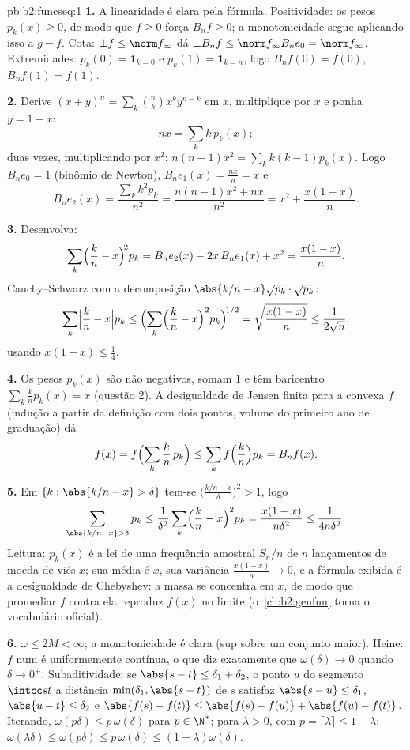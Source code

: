 \begin{solution}{pb:b2:funcseq:1}
\textbf{1.} A linearidade é clara pela fórmula. Positividade:
os pesos $p_k(x) \geq 0$, de modo que $f \geq 0$ força $B_nf \geq
0$; a monotonicidade segue aplicando isso a $g - f$. Cota: $\pm f \leq
\norm f_\infty$ dá $\pm B_nf \leq \norm f_\infty B_ne_0 =
\norm f_\infty$. Extremidades: $p_k(0) = \mathbf 1_{k=0}$ e
$p_k(1) = \mathbf 1_{k=n}$, logo $B_nf(0) = f(0)$, $B_nf(1) =
f(1)$.

\textbf{2.} Derive $(x+y)^n = \sum_k\binom nk x^ky^{n-k}$
em $x$, multiplique por $x$ e ponha $y = 1 - x$:
\[
nx = \sum_k k\,p_k(x) ;
\]
duas vezes, multiplicando por $x^2$: $n(n-1)x^2 = \sum_k k(k-1)p_k(x)$.
Logo $B_ne_0 = 1$ (binômio de Newton), $B_ne_1(x) =
\frac{nx}{n} = x$ e
\[
B_ne_2(x) = \frac{\sum_k k^2p_k}{n^2}
= \frac{n(n-1)x^2 + nx}{n^2}
= x^2 + \frac{x(1-x)}{n} .
\]

\textbf{3.} Desenvolva:
\[
\sum_k\Bigl(\frac kn - x\Bigr)^{\!2} p_k
= B_ne_2(x) - 2x\,B_ne_1(x) + x^2
= \frac{x(1-x)}{n} .
\]
Cauchy--Schwarz com a decomposição $\abs{k/n - x}\sqrt{p_k}
\cdot \sqrt{p_k}$:
\[
\sum_k\Bigl|\frac kn - x\Bigr| p_k
\leq \Bigl(\sum_k\Bigl(\frac kn - x\Bigr)^2
p_k\Bigr)^{\!1/2}
= \sqrt{\frac{x(1-x)}{n}} \leq \frac{1}{2\sqrt n},
\]
usando $x(1-x) \leq \frac14$.

\textbf{4.} Os pesos $p_k(x)$ são não negativos, somam $1$
e têm baricentro $\sum_k \frac kn p_k(x) = x$ (questão 2). A
desigualdade de Jensen finita para a convexa $f$ (indução a partir da
definição com dois pontos, volume do primeiro ano de graduação) dá
\[
f(x) = f\Bigl(\sum_k \frac kn\,p_k\Bigr)
\leq \sum_k f\Bigl(\frac kn\Bigr)p_k = B_nf(x) .
\]

\textbf{5.} Em $\{k : \abs{k/n - x} > \delta\}$ tem-se
$\bigl(\frac{k/n - x}{\delta}\bigr)^2 > 1$, logo
\[
\sum_{\abs{k/n-x}>\delta} p_k
\leq \frac{1}{\delta^2}\sum_k\Bigl(\frac kn -
x\Bigr)^2p_k
= \frac{x(1-x)}{n\delta^2} \leq \frac{1}{4n\delta^2} .
\]
Leitura: $p_k(x)$ é a lei de uma frequência amostral $S_n/n$ de
$n$ lançamentos de moeda de viés $x$; sua média é $x$, sua variância
$\frac{x(1-x)}n \to 0$, e a fórmula exibida é a desigualdade de Chebyshev:
a massa se concentra em $x$, de modo que promediar $f$
contra ela reproduz $f(x)$ no limite
(o~\cref{ch:b2:genfun} torna o vocabulário oficial).

\textbf{6.} $\omega \leq 2M < \infty$; a monotonicidade é clara
(sup sobre um conjunto maior). Heine: $f$  num  é
uniformemente contínua, o que diz exatamente que $\omega(\delta) \to 0$
quando $\delta \to 0^+$. Subaditividade: se $\abs{s - t} \leq
\delta_1 + \delta_2$, o ponto $u$ do segmento $\intcc st$
a distância $\min(\delta_1, \abs{s-t})$ de $s$ satisfaz
$\abs{s-u} \leq \delta_1$, $\abs{u-t} \leq \delta_2$ e
$\abs{f(s)-f(t)} \leq \abs{f(s)-f(u)} + \abs{f(u)-f(t)}$.
Iterando, $\omega(p\delta) \leq p\,\omega(\delta)$ para $p \in
\N^*$; para $\lambda > 0$, com $p = \lceil\lambda\rceil \leq 1
+ \lambda$: $\omega(\lambda\delta) \leq \omega(p\delta) \leq
p\,\omega(\delta) \leq (1+\lambda)\omega(\delta)$.


\end{solution}
